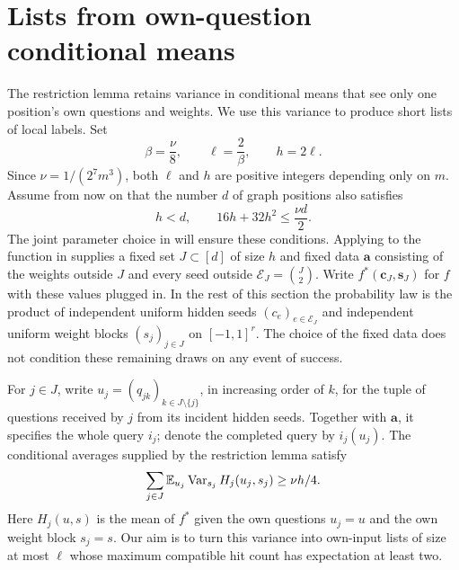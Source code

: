 \section{Lists from own-question conditional means}
\label{ana:private-section}

The restriction lemma retains variance in conditional means that see
only one position's own questions and weights. We use this variance
to produce short lists of local labels. Set
\begin{equation}
 \beta=\frac\nu8,\qquad \ell=\frac2\beta,\qquad h=2\ell.
 \label{src:list-parameters}
\end{equation}
Since \(\nu=1/(2^7m^3)\), both \(\ell\) and \(h\) are
positive integers depending only on \(m\). Assume from now on that
the number \(d\) of graph positions also satisfies
\begin{equation}
 h<d,\qquad 16h+32h^2\leq\frac{\nu d}{2}.
 \label{src:restriction-budget}
\end{equation}
The joint parameter choice in  will ensure
these conditions. Applying  to the
function in  supplies a fixed set
\(J\subset[d]\) of size \(h\) and fixed data \(\boldsymbol a\)
consisting of the weights outside \(J\) and every seed outside
\(\mathcal E_J=\binom J2\). Write
\(f^*(\boldsymbol c_J,\boldsymbol s_J)\) for \(f\) with these
values plugged in. In the rest of this section the probability law
is the product of independent uniform hidden seeds
\((c_e)_{e\in\mathcal E_J}\) and independent uniform weight blocks
\((s_j)_{j\in J}\) on \([-1,1]^r\). The choice of the fixed data
does not condition these remaining draws on any event of success.

For \(j\in J\), write
\(u_j=(q_{jk})_{k\in J\setminus\{j\}}\), in increasing order of
\(k\), for the tuple of questions received by \(j\) from its
incident hidden seeds. Together with \(\boldsymbol a\), it
specifies the whole query \(i_j\); denote the completed query by
\(i_j(u_j)\). The conditional averages supplied by the restriction
lemma satisfy
\begin{equation}
 \sum_{j\in J}\mathbb E_{u_j}\operatorname{Var}_{s_j}H_j(u_j,s_j)
       \geq\nu h/4.
 \label{ana:restricted-variance}
\end{equation}
Here \(H_j(u,s)\) is the mean of \(f^*\) given the own questions
\(u_j=u\) and the own weight block \(s_j=s\).
Our aim is to turn this variance into own-input lists of size at most
\(\ell\) whose maximum compatible hit count has expectation at
least two.

